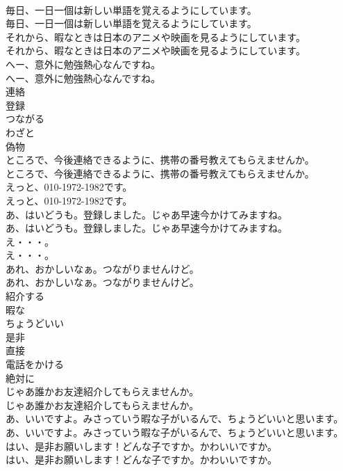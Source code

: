 \documentclass[8pt]{extreport}
\begin{document}
\begin{CJK}{UTF8}{min}
\\	毎日、一日一個は新しい単語を覚えるようにしています。	
\\	毎日、一日一個は新しい単語を覚えるようにしています。 
\\	それから、暇なときは日本のアニメや映画を見るようにしています。	
\\	それから、暇なときは日本のアニメや映画を見るようにしています。 
\\	へー、意外に勉強熱心なんですね。	
\\	へー、意外に勉強熱心なんですね。 
\\	連絡
\\	登録
\\	つながる
\\	わざと
\\	偽物
\\	ところで、今後連絡できるように、携帯の番号教えてもらえませんか。	
\\	ところで、今後連絡できるように、携帯の番号教えてもらえませんか。 
\\	えっと、010-1972-1982です。	
\\	えっと、010-1972-1982です。 
\\	あ、はいどうも。登録しました。じゃあ早速今かけてみますね。	
\\	あ、はいどうも。登録しました。じゃあ早速今かけてみますね。 
\\	え・・・。	
\\	え・・・。 
\\	あれ、おかしいなぁ。つながりませんけど。	
\\	あれ、おかしいなぁ。つながりませんけど。 
\\	紹介する
\\	暇な
\\	ちょうどいい
\\	是非
\\	直接
\\	電話をかける
\\	絶対に
\\	じゃあ誰かお友達紹介してもらえませんか。	
\\	じゃあ誰かお友達紹介してもらえませんか。 
\\	あ、いいですよ。みさっていう暇な子がいるんで、ちょうどいいと思います。	
\\	あ、いいですよ。みさっていう暇な子がいるんで、ちょうどいいと思います。 
\\	はい、是非お願いします！どんな子ですか。かわいいですか。	
\\	はい、是非お願いします！どんな子ですか。かわいいですか。 

\end{CJK}
\end{document}
